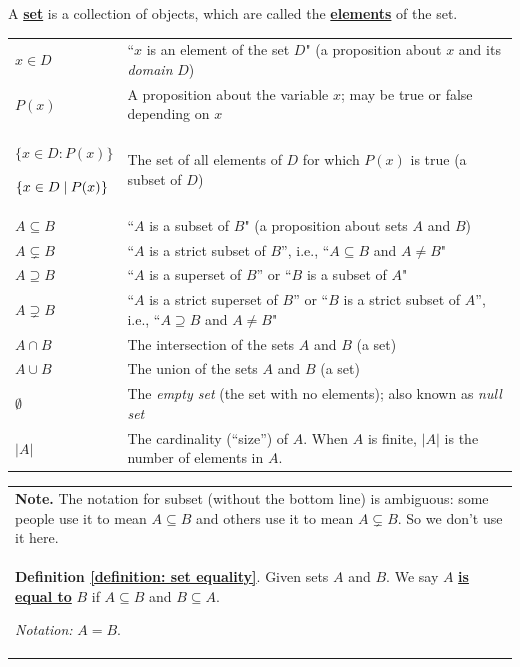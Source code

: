 \documentclass[11pt]{article}
\renewcommand\subset\subseteq
\newcommand\st{:}
\renewcommand\emph[1]{\underline{\bf{#1}}} %
\theoremstyle{definition}
\begin{document}
 A \emph{set} is a collection of objects, which are called the \emph{elements} of the set.


\vspace*{8pt}
\begin{tabular}{L{1in}L{5in}}
$x\in D$ & ``$x$ is an element of the set $D$"  (a proposition about $x$ and its {\it domain} $D$)\\

$P(x)$ & A proposition about the variable $x$; may be true or false depending on $x$ \\

$\{x \in D\st P(x)\}$ 

$\{x\in D \hspace*{2.5pt}|\hspace*{2.5pt} P(x)\hspace*{.25pt}\}$ & The set of all elements of $D$ for which $P(x)$ is true (a subset of $D$)\\ 

$A \subseteq B$ & ``$A$ is a subset of $B$"  (a proposition about sets $A$ and $B$)\\

$A \subsetneq B$ & ``$A$ is a strict subset of $B$'', i.e., ``$A\subseteq B$ and $A \neq B$" \\
$A \supseteq B$ & ``$A$ is a superset of $B$'' or ``$B$ is a subset of $A$" \\

$A \supsetneq B$ &  ``$A$ is a strict superset of $B$'' or ``$B$ is a strict subset of $A$'',  i.e., ``$A\supseteq B$ and $A \neq B$"   \\ 


$A \cap B$ & The intersection of the sets $A$ and $B$  (a set)\\

$A \cup B$ & The union of the sets $A$ and $B$  (a set)\\

$\emptyset$ & The {\it empty set} (the set with no elements); also known as {\it null set}\\
$|A|$ & The cardinality (``size'') of $A$. When $A$ is finite, $|A|$ is the number of elements in $A$.
\end{tabular}

\vspace*{8pt}

\begin{tabular}{L{6in}}{\bf Note.} The notation for subset (without the bottom line) is ambiguous: some people use it to mean $A \subseteq B$ and others use it to mean $A \subsetneq B$. So we don't use it here. \\ 

 {\bf Definition \ref{definition: set equality}}.
Given sets $A$ and $B$. We say $A$ \emph{is equal to} $B$ if $A\subset B$ and $B\subset A$. 

{\it Notation:} $A=B$.
\end{tabular}
\end{document}
